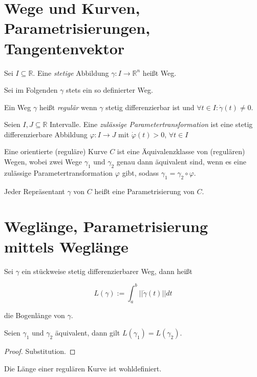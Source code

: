 \section{Wege und Kurven, Parametrisierungen, Tangentenvektor}
\begin{definition}[Weg]
	Sei $I \subseteq \mathbb{R}$. Eine \textit{stetige} Abbildung $\gamma: I \rightarrow \mathbb{R}^n$ hei\ss t Weg.
\end{definition}

Sei im Folgenden $\gamma$ stets ein so definierter Weg.

\begin{definition}
	Ein Weg $\gamma$ hei\ss t \textit{regul\"ar} wenn $\gamma$ stetig differenzierbar ist und $\forall t \in I: \dot{\gamma}(t) \neq 0$.
\end{definition}

\begin{definition}[Parametertransformation]
	Seien $I,J \subseteq \mathbb{R}$ Intervalle.
	Eine \textit{zul\"assige Parametertransformation} ist eine stetig differenzierbare Abbildung $\varphi: I \rightarrow J$ mit $\dot{\varphi}(t) > 0$, $\forall t \in I$
\end{definition}

\begin{definition}[Kurve]
	Eine orientierte (regul\"are) Kurve $C$ ist eine \"Aquivalenzklasse von (regul\"aren) Wegen, wobei zwei Wege $\gamma_1$ und $\gamma_2$ genau dann \"aquivalent sind, wenn es eine zul\"assige Parametertransformation $\varphi$ gibt, sodass $\gamma_1 = \gamma_2 \circ \varphi$.
	
	Jeder Repr\"asentant $\gamma$ von $C$ hei\ss t eine Parametrisierung von $C$.
\end{definition}




\section{Wegl\"ange, Parametrisierung mittels Wegl\"ange}
\begin{definition}
	Sei $\gamma$ ein stückweise stetig differenzierbarer Weg, dann hei\ss t 
	
	$$L(\gamma) := \int_a^b ||\dot{\gamma}(t)||dt$$
	
	die Bogenl\"ange von $\gamma$.
\end{definition}

\begin{lemma}
	Seien $\gamma_1$ und $\gamma_2$ \"aquivalent, dann gilt $L(\gamma_1) = L(\gamma_2)$.
\end{lemma}
\begin{proof}
	Substitution.
\end{proof}
\begin{corollary}
	Die L\"ange einer regul\"aren Kurve ist wohldefiniert.
\end{corollary}

